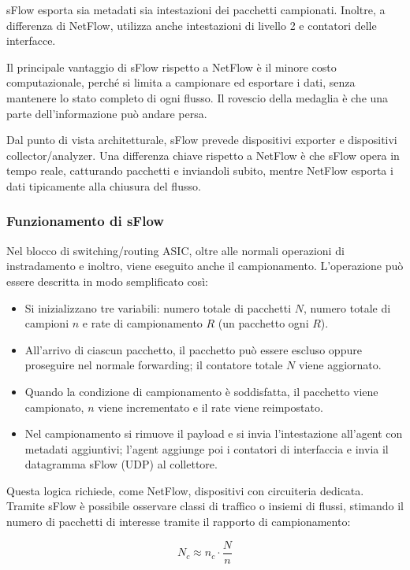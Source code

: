 sFlow esporta sia metadati sia intestazioni dei pacchetti campionati.
Inoltre, a differenza di NetFlow, utilizza anche intestazioni di livello 2
e contatori delle interfacce.

Il principale vantaggio di sFlow rispetto a NetFlow è il minore costo
computazionale, perché si limita a campionare ed esportare i dati, senza
mantenere lo stato completo di ogni flusso. Il rovescio della medaglia è che
una parte dell'informazione può andare persa.

Dal punto di vista architetturale, sFlow prevede dispositivi exporter e
dispositivi collector/analyzer. Una differenza chiave rispetto a NetFlow è
che sFlow opera in tempo reale, catturando pacchetti e inviandoli subito,
mentre NetFlow esporta i dati tipicamente alla chiusura del flusso.

\subsubsection{Funzionamento di sFlow}

Nel blocco di switching/routing ASIC, oltre alle normali operazioni di
instradamento e inoltro, viene eseguito anche il campionamento.
L'operazione può essere descritta in modo semplificato così:

\begin{itemize}
\item Si inizializzano tre variabili: numero totale di pacchetti $N$, numero
totale di campioni $n$ e rate di campionamento $R$ (un pacchetto ogni $R$).
\item All'arrivo di ciascun pacchetto, il pacchetto può essere escluso oppure
proseguire nel normale forwarding; il contatore totale $N$ viene aggiornato.
\item Quando la condizione di campionamento è soddisfatta, il pacchetto viene
campionato, $n$ viene incrementato e il rate viene reimpostato.
\item Nel campionamento si rimuove il payload e si invia l'intestazione
all'agent con metadati aggiuntivi; l'agent aggiunge poi i contatori di
interfaccia e invia il datagramma sFlow (UDP) al collettore.
\end{itemize}

Questa logica richiede, come NetFlow, dispositivi con circuiteria dedicata.
Tramite sFlow è possibile osservare classi di traffico o insiemi di flussi,
stimando il numero di pacchetti di interesse tramite il rapporto di
campionamento:

$$
N_c \approx n_c \cdot \frac{N}{n}
$$

